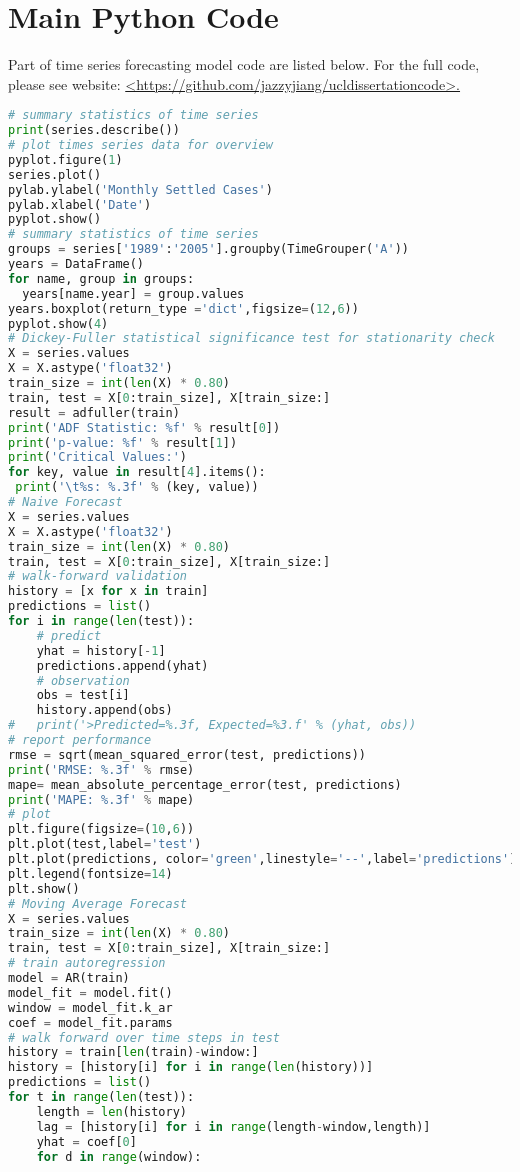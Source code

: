 \section{Main Python Code}
Part of time series forecasting model code are listed below. For the full code, please see website: \href{https://github.com/jazzyjiang/ucldissertationcode}{\colorbox{Graylight}{<https://github.com/jazzyjiang/ucldissertationcode>.}}
\begin{lstlisting}[language=Python]
# summary statistics of time series
print(series.describe())
# plot times series data for overview
pyplot.figure(1)
series.plot()
pylab.ylabel('Monthly Settled Cases')
pylab.xlabel('Date')
pyplot.show()
# summary statistics of time series
groups = series['1989':'2005'].groupby(TimeGrouper('A')) 
years = DataFrame()
for name, group in groups:
  years[name.year] = group.values
years.boxplot(return_type ='dict',figsize=(12,6))
pyplot.show(4)
# Dickey-Fuller statistical significance test for stationarity check
X = series.values
X = X.astype('float32')
train_size = int(len(X) * 0.80)
train, test = X[0:train_size], X[train_size:]
result = adfuller(train)
print('ADF Statistic: %f' % result[0]) 
print('p-value: %f' % result[1])
print('Critical Values:')
for key, value in result[4].items():
 print('\t%s: %.3f' % (key, value))  
# Naive Forecast
X = series.values
X = X.astype('float32')
train_size = int(len(X) * 0.80)
train, test = X[0:train_size], X[train_size:]
# walk-forward validation
history = [x for x in train]
predictions = list()
for i in range(len(test)):
	# predict
	yhat = history[-1]
	predictions.append(yhat)
	# observation
	obs = test[i]
	history.append(obs)
#	print('>Predicted=%.3f, Expected=%3.f' % (yhat, obs))
# report performance
rmse = sqrt(mean_squared_error(test, predictions))
print('RMSE: %.3f' % rmse)
mape= mean_absolute_percentage_error(test, predictions)
print('MAPE: %.3f' % mape)
# plot
plt.figure(figsize=(10,6))
plt.plot(test,label='test')
plt.plot(predictions, color='green',linestyle='--',label='predictions')
plt.legend(fontsize=14)
plt.show()
# Moving Average Forecast
X = series.values
train_size = int(len(X) * 0.80)
train, test = X[0:train_size], X[train_size:]
# train autoregression
model = AR(train)
model_fit = model.fit()
window = model_fit.k_ar
coef = model_fit.params
# walk forward over time steps in test
history = train[len(train)-window:]
history = [history[i] for i in range(len(history))]
predictions = list()
for t in range(len(test)):
	length = len(history)
	lag = [history[i] for i in range(length-window,length)]
	yhat = coef[0]
	for d in range(window):

\end{lstlisting}
